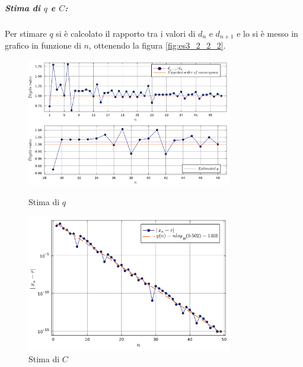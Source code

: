 \documentclass[letterpaper, 12pt]{article}
\numberwithin{equation}{section}    %
\begin{document}
\subparagraph{Stima di $q$ e $C$:} Per stimare $q$ si è calcolato il rapporto tra i valori di $d_n$ e $d_{n+1}$ e lo si
è messo in grafico in funzione di $n$, ottenendo la figura \ref{fig:es3_2_2_2}.
\begin{figure}[!ht]
    \begin{minipage}[b]{0.54\textwidth}
    \centering
    \includegraphics[width=0.8\textwidth]{3222.pdf}
    \caption{Stima di $q$}
    \label{fig:es3_2_2_2}
    \end{minipage}
    \begin{minipage}[b]{0.54\textwidth}
    \centering
    \includegraphics[width=0.8\textwidth]{3223.pdf}
    \caption{Stima di $C$}
    \label{fig:es3_2_2_3}
    \end{minipage}
\end{figure}
\end{document}
